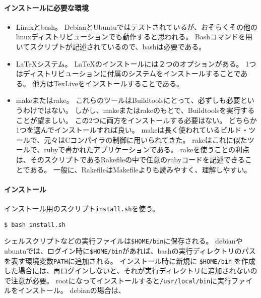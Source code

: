 \hypertarget{ux30a4ux30f3ux30b9ux30c8ux30fcux30ebux306bux5fc5ux8981ux306aux74b0ux5883}{%
\paragraph{インストールに必要な環境}\label{ux30a4ux30f3ux30b9ux30c8ux30fcux30ebux306bux5fc5ux8981ux306aux74b0ux5883}}

\begin{itemize}
\item
  Linuxとbash。
  DebianとUbuntuではテストされているが、おそらくその他のlinuxディストリビューションでも動作すると思われる。
  Bashコマンドを用いてスクリプトが記述されているので、bashは必要である。
\item
  LaTeXシステム。 LaTeXのインストールには２つのオプションがある。
  1つはディストリビューションに付属のシステムをインストールすることである。
  他方はTexLiveをインストールすることである。
\item
  makeまたはrake。
  これらのツールはBuildtoolsにとって、必ずしも必要というわけではない。
  しかし、makeまたはrakeのもとで、Buildtoolsを実行することが望ましい。
  この2つに両方をインストールする必要はない。
  どちらか1つを選んでインストールすれば良い。
  makeは長く使われているビルド・ツールで、元々はCコンパイラの制御に用いられてきた。
  rakeはこれに似たツールで、rubyで書かれたアプリケーションである。
  rakeを使うことの利点は、そのスクリプトであるRakefileの中で任意のrubyコードを記述できることである。
  一般に、RakefileはMakefileよりも読みやすく、理解しやすい。
\end{itemize}

\hypertarget{ux30a4ux30f3ux30b9ux30c8ux30fcux30eb}{%
\paragraph{インストール}\label{ux30a4ux30f3ux30b9ux30c8ux30fcux30eb}}

インストール用のスクリプト\texttt{install.sh}を使う。

\begin{verbatim}
$ bash install.sh
\end{verbatim}

シェルスクリプトなどの実行ファイルは\texttt{\$HOME/bin}に保存される。
debianやubuntuでは、ログイン時に\texttt{\$HOME/bin}があれば、bashの実行ディレクトリのパスを表す環境変数\texttt{PATH}に追加される。
インストール時に新規に \texttt{\$HOME/bin}
を作成した場合には、再ログインしないと、それが実行ディレクトリに追加されないので注意が必要。
rootになってインストールすると\texttt{/usr/local/bin}に実行ファイルをインストール。
debianの場合は、

